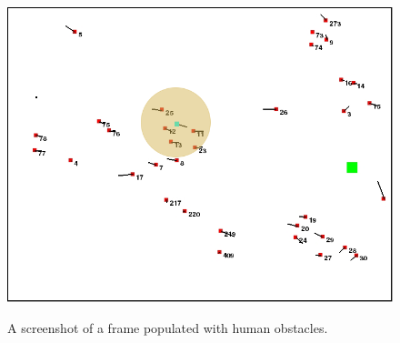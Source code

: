%


\begin{figure}[!htbp]
	\label{fig:agent-perspective-risk-features}
		\centering
		\includegraphics[width=\textwidth]{figures/env_screenshot_agent_perspective.png}
		\label{fig:agent-perspective_env}
		\centering
		\caption{A screenshot of a frame populated with human obstacles.} 
\end{figure}

